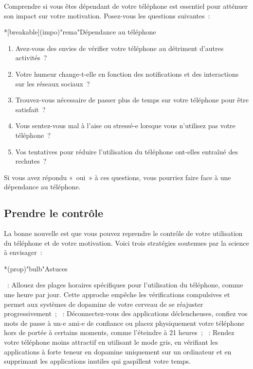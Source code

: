 \documentclass[a4paper, 12pt, garamond]{book}
\begin{document}
Comprendre si vous êtes dépendant de votre téléphone est essentiel pour atténuer
son impact sur votre motivation. Posez-vous les questions suivantes~:
\begin{tcb}*[breakable](impo)"rema"{Dépendance au téléphone}
	\begin{enumerate}
		\item Avez-vous des envies de vérifier votre téléphone au détriment d'autres
		      activités~?
		\item Votre humeur change-t-elle en fonction des notifications et des
		      interactions sur les réseaux sociaux~?
		\item Trouvez-vous nécessaire de passer plus de temps sur votre téléphone pour
		      être satisfait~?
		\item Vous sentez-vous mal à l'aise ou stressé-e lorsque vous n'utilisez pas
		      votre téléphone~?
		\item Vos tentatives pour réduire l'utilisation du téléphone ont-elles
		      entraîné des rechutes~?
	\end{enumerate}
\end{tcb}

Si vous avez répondu «~oui~» à ces questions, vous pourriez faire face à une
dépendance au téléphone.

\subsection{Prendre le contrôle}

La bonne nouvelle est que vous pouvez reprendre le contrôle de votre utilisation
du téléphone et de votre motivation. Voici trois stratégies soutenues par la
science à envisager~:
\begin{tcb}*(prop)"bulb"{Astuces}
	\begin{enumerate}
		~: Allouez des plages horaires spécifiques
		pour l'utilisation du téléphone, comme une heure par jour. Cette
		approche empêche les vérifications compulsives et permet aux systèmes de
		dopamine de votre cerveau de se réajuster progressivement~;
		~: Déconnectez-vous des applications
		déclencheuses, confiez vos mots de passe à un-e ami-e de confiance ou placez
		physiquement votre téléphone hors de portée à certains moments, comme
		l'éteindre à 21 heures~;
		~: Rendez votre téléphone moins attractif
		en utilisant le mode gris, en vérifiant les applications à forte teneur en
		dopamine uniquement sur un ordinateur et en supprimant les applications
		inutiles qui gaspillent votre temps.
	\end{enumerate}
\end{tcb}
\end{document}
